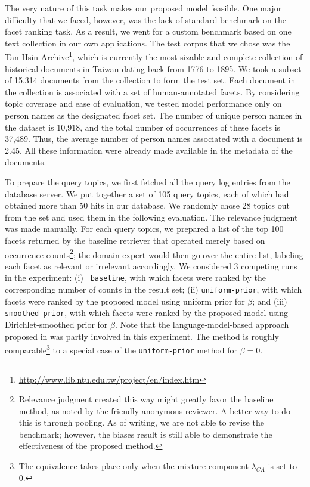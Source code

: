 The very nature of this task makes our proposed model feasible.  One major
difficulty that we faced, however, was the lack of standard benchmark on the
facet ranking task.  As a result, we went for a custom benchmark based on one
text collection in our own applications.  The test corpus that we chose was the
Tan-Hsin
Archive\footnote{\url{http://www.lib.ntu.edu.tw/project/en/index.htm}}, which
is currently the most sizable and complete collection of historical documents
in Taiwan dating back from 1776 to 1895.  We took a subset of 15,314 documents
from the collection to form the test set.  Each document in the collection is
associated with a set of human-annotated facets.  By considering topic coverage
and ease of evaluation, we tested model performance only on person names as the
designated facet set.  The number of unique person names in the dataset is
10,918, and the total number of occurrences of these facets is 37,489.  Thus,
the average number of person names associated with a document is 2.45.  All
these information were already made available in the metadata of the documents.  

To prepare the query topics, we first fetched all the query log entries from
the database server.  We put together a set of 105 query topics, each of which
had obtained more than 50 hits in our database.  We randomly chose 28 topics
out from the set and used them in the following evaluation.  The relevance
judgment was made manually.  For each query topics, we prepared a list of the
top 100 facets returned by the baseline retriever that operated merely based on
occurrence counts\footnote{Relevance judgment created this way might greatly
favor the baseline method, as noted by the friendly anonymous reviewer.  A
better way to do this is through pooling.  As of writing, we are not able to
revise the benchmark; however, the biases result is still able to demonstrate
the effectiveness of the proposed method.}; the domain expert would then go
over the entire list, labeling each facet as relevant or irrelevant
accordingly.  We considered 3 competing runs in the experiment: (i) {\tt
baseline}, with which facets were ranked by the corresponding number of counts
in the result set; (ii) {\tt uniform-prior}, with which facets were ranked by
the proposed model using uniform prior for $\beta$; and (iii) {\tt
smoothed-prior}, with which facets were ranked by the proposed model using
Dirichlet-smoothed prior for $\beta$.  Note that the language-model-based
approach proposed in \cite{balog2009language} was partly involved in this
experiment.  The method is roughly comparable\footnote{The equivalence takes place only when the mixture component $\lambda_{CA}$ is set to 0.} to a special case of the {\tt uniform-prior} method
for $\beta = 0$.  

